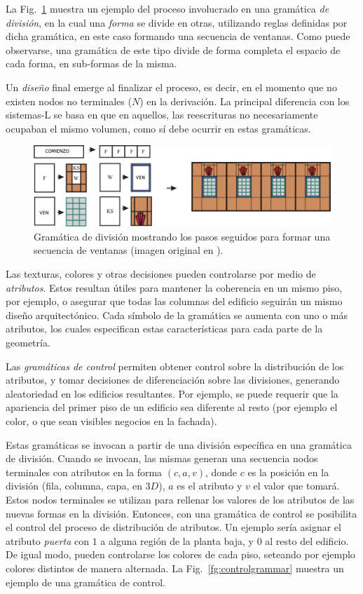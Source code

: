 La Fig.~\ref{fg:splitgrammar} muestra un ejemplo del proceso involucrado en una gramática {\em de división}, en la cual una {\em forma} se divide en otras, utilizando reglas definidas por dicha gramática, en este caso formando una secuencia de ventanas.
Como puede observarse, una gramática de este tipo divide de forma completa el espacio de cada forma, en sub-formas de la misma.

Un {\em diseño} final emerge al finalizar el proceso, es decir, en el momento que no existen nodos no terminales ($N$) en la derivación.
La principal diferencia con los sistemas-L se basa en que en aquellos, las reescrituras no necesariamente ocupaban el mismo volumen, como sí debe ocurrir en estas gramáticas.

\begin{figure}
\center
\includegraphics[width=13cm]{figures/splitgrammar}
\caption[Gramática para formar una secuencia de ventanas]{Gramática de división mostrando los pasos seguidos para formar una secuencia de ventanas (imagen original en \cite{Wonka2003}).}
\label{fg:splitgrammar}
\end{figure}

Las texturas, colores y otras decisiones pueden controlarse por medio de {\em atributos}.
Estos resultan útiles para mantener la coherencia en un mismo piso, por ejemplo, o asegurar que todas las columnas del edificio seguirán un mismo diseño arquitectónico.
Cada símbolo de la gramática se aumenta con uno o más atributos, los cuales especifican estas características para cada parte de la geometría.


Las {\em gramáticas de control} permiten obtener control sobre la distribución de los atributos, y tomar decisiones de diferenciación sobre las divisiones, generando aleatoriedad en los edificios resultantes.
Por ejemplo, se puede requerir que la apariencia del primer piso de un edificio sea diferente al resto (por ejemplo el color, o que sean visibles negocios en la fachada).

Estas gramáticas se invocan a partir de una división específica en una gramática de división.
Cuando se invocan, las mismas generan una secuencia nodos terminales con atributos en la forma $(c,a,v)$, donde $c$ es la posición en la división (fila, columna, capa, en $3D$), $a$ es el atributo y $v$ el valor que tomará.
Estos nodos terminales se utilizan para rellenar los valores de los atributos de las nuevas formas en la división.
Entonces, con una gramática de control se posibilita el control del proceso de distribución de atributos.
Un ejemplo sería asignar el atributo {\em puerta} con $1$ a alguna región de la planta baja, y $0$ al resto del edificio.
De igual modo, pueden controlarse los colores de cada piso, seteando por ejemplo colores distintos de manera alternada.
La Fig.~\ref{fg:controlgrammar} muestra un ejemplo de una gramática de control.


